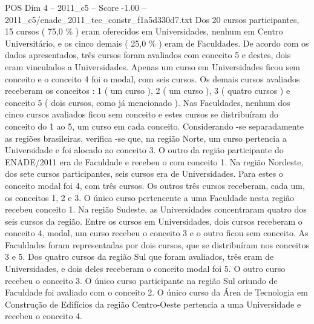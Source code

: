 \begin{textsample}{POS Dim 4 – 2011\_c5 – Score -1.00 – 2011\_c5/enade\_2011\_tec\_constr\_f1a5d330d7.txt}
Dos 20 cursos participantes, 15 cursos ( 75,0 \% ) eram oferecidos em Universidades, nenhum em Centro Universitário, e os cinco demais ( 25,0 \% ) eram de Faculdades.
De acordo com os dados apresentados, três cursos foram avaliados com conceito 5 e destes, dois eram vinculados a Universidades.
Apenas um curso em Universidades ficou sem conceito e o conceito 4 foi o modal, com seis cursos.
Os demais cursos avaliados receberam os conceitos : 1 ( um curso ), 2 ( um curso ), 3 ( quatro cursos ) e conceito 5 ( dois cursos, como já mencionado ).
Nas Faculdades, nenhum dos cinco cursos avaliados ficou sem conceito e estes cursos se distribuíram do conceito do 1 ao 5, um curso em cada conceito.
Considerando -se separadamente as regiões brasileiras, verifica -se que, na região Norte, um curso pertencia a Universidade e foi alocado ao conceito 3.
O outro da região participante do ENADE/2011 era de Faculdade e recebeu o com conceito 1.
Na região Nordeste, dos sete cursos participantes, seis cursos era de Universidades.
Para estes o conceito modal foi 4, com três cursos.
Os outros três cursos receberam, cada um, os conceitos 1, 2 e 3.
O único curso pertencente a uma Faculdade nesta região recebeu conceito 1.
Na região Sudeste, as Universidades concentraram quatro dos seis cursos da região.
Entre os cursos em Universidades, dois cursos receberam o conceito 4, modal, um curso recebeu o conceito 3 e o outro ficou sem conceito.
As Faculdades foram representadas por dois cursos, que se distribuíram nos conceitos 3 e 5.
Dos quatro cursos da região Sul que foram avaliados, três eram de Universidades, e dois deles receberam o conceito modal foi 5.
O outro curso recebeu o conceito 3.
O único curso participante na região Sul oriundo de Faculdade foi avaliado com o conceito 2.
O único curso da Área de Tecnologia em Construção de Edifícios da região Centro-Oeste pertencia a uma Universidade e recebeu o conceito 4.

\end{textsample}
